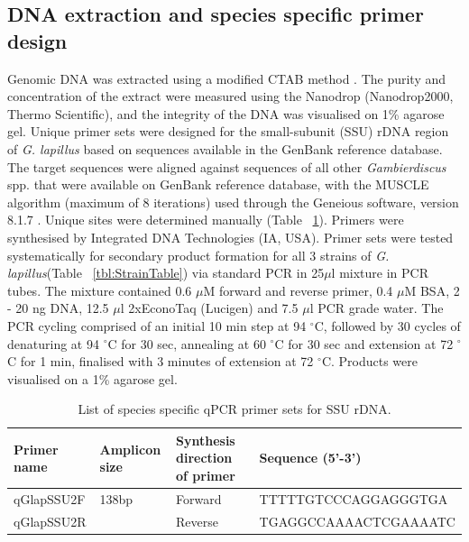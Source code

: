 \documentclass[12pt]{article}
\begin{document}
\subsection*{DNA extraction and species specific primer design}
\FloatBarrier
Genomic DNA was extracted using a modified CTAB method \citep{verma2016molecular}. 
The purity and concentration of the extract were measured using the Nanodrop (Nanodrop2000, Thermo Scientific), and the integrity of the DNA was visualised on 1\% agarose gel.
Unique primer sets were designed for the small-subunit (SSU) rDNA region of \emph{G. lapillus} %
based on sequences available in the GenBank reference database. 
The target sequences were aligned against sequences of all other \emph{Gambierdiscus} spp. that were available on GenBank reference database, with the MUSCLE algorithm (maximum of 8 iterations) \citep{edgar2004muscle} used through the Geneious software, version 8.1.7 \citep{kearse2012geneious}. 
Unique sites were determined manually (Table ~\ref{tbl:PrimerTable}). 
Primers were synthesised by Integrated DNA Technologies (IA, USA).
Primer sets were tested systematically for secondary product formation for all 3 strains of \emph{G. lapillus}(Table ~\ref{tbl:StrainTable}) via standard PCR in 25$\mu$l mixture in PCR tubes.  %
The mixture contained 0.6 $\mu$M forward and reverse primer, 0.4 $\mu$M BSA, 2 - 20 ng DNA, 12.5 $\mu$l 2xEconoTaq (Lucigen) and 7.5 $\mu$l PCR grade water.
The PCR cycling comprised of an initial 10 min step at 94 $^{\circ}$C, followed by 30 cycles of denaturing at 94 $^{\circ}$C for 30 sec, annealing at 60 $^{\circ}$C for 30 sec and extension at 72 $^{\circ}$C for 1 min, finalised with 3 minutes of extension at 72 $^{\circ}$C. 
Products were visualised on a 1\% agarose gel.
\begin{table}
\caption{List of species specific qPCR primer sets for SSU rDNA.}
\label{tbl:PrimerTable}
\begin{tabular}{ | p{2.5cm} | p{2cm} | p{2cm} | p{6.5cm} | }
\hline
\textbf{Primer name} &\textbf{Amplicon size} &  \textbf{Synthesis direction of primer} & \textbf{Sequence (5'-3')} \\
\hline
qGlapSSU2F&138bp&Forward&TTTTTGTCCCAGGAGGGTGA\\
\hline
qGlapSSU2R&&Reverse&TGAGGCCAAAACTCGAAAATC\\
\hline
\end{tabular}
\end{table}
\FloatBarrier
\end{document}
